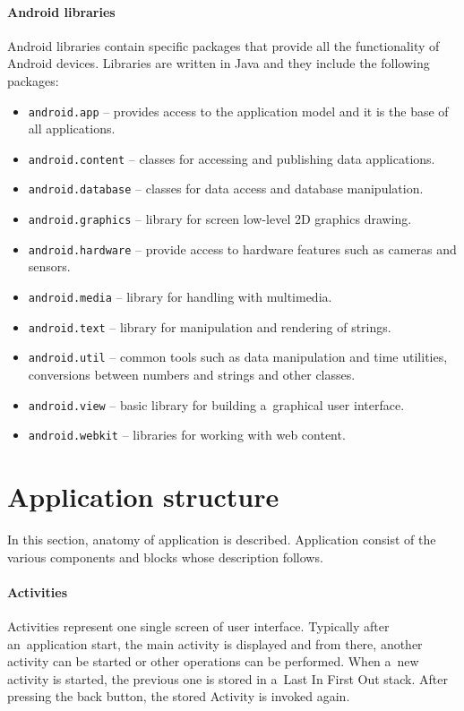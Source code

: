 \paragraph{Android libraries}
Android libraries contain specific packages that provide all the functionality of Android devices. Libraries are written
in Java and they include the following packages:

\begin{itemize}
    \item \texttt{android.app} -- provides access to the application model and it is the base of all applications.
    \item \texttt{android.content} -- classes for accessing and publishing data applications.
    \item \texttt{android.database} -- classes for data access and database manipulation.
    \item \texttt{android.graphics} -- library for screen low-level 2D graphics drawing.
    \item \texttt{android.hardware} -- provide access to hardware features such as cameras and sensors.
    \item \texttt{android.media} -- library for handling with multimedia.
    \item \texttt{android.text} -- library for manipulation and rendering of strings.
    \item \texttt{android.util} -- common tools such as data manipulation and time utilities, conversions between
    numbers and strings and other classes.
    \item \texttt{android.view} -- basic library for building a~graphical user interface.
    \item \texttt{android.webkit} -- libraries for working with web content.
\end{itemize}

\section{Application structure}\label{AppStructureSection}
In this section, anatomy of application is described. Application consist of the various components and blocks whose
description follows.

\paragraph{Activities}
Activities represent one single screen of user interface. Typically after an~application start, the main activity is
displayed and from there, another activity can be started or other operations can be performed. When a~new activity is
started, the previous one is stored in a~Last In First Out stack. After pressing the back button, the stored Activity is
invoked again.


